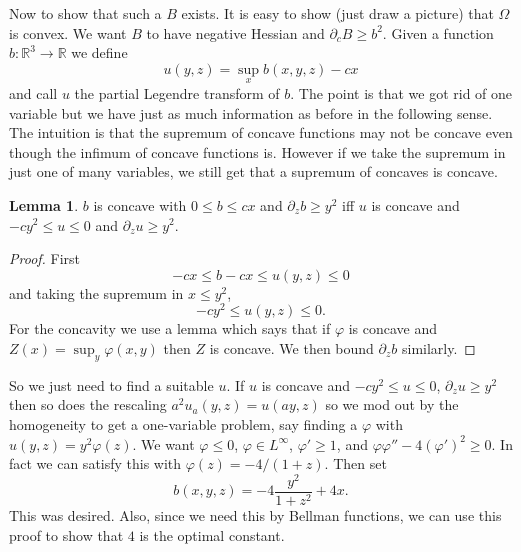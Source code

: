 \documentclass[12pt]{book}
\newcommand{\RR}{\mathbb{R}}
\theoremstyle{definition}
\newtheorem{lemma}[theorem]{Lemma}
\begin{document}
Now to show that such a $B$ exists.
It is easy to show (just draw a picture) that $\Omega$ is convex.
We want $B$ to have negative Hessian and $\partial_c B \geq b^2$.
Given a function $b: \RR^3 \to \RR$ we define
$$u(y, z) = \sup_x b(x, y, z) - cx$$
and call $u$ the partial Legendre transform of $b$.
The point is that we got rid of one variable but we have just as much information as before in the following sense.
The intuition is that the supremum of concave functions may not be concave even though the infimum of concave functions is.
However if we take the supremum in just one of many variables, we still get that a supremum of concaves is concave.

\begin{lemma}
$b$ is concave with $0 \leq b \leq cx$ and $\partial_z b \geq y^2$ iff $u$ is concave and $-cy^2 \leq u \leq 0$ and $\partial_z u \geq y^2$.
\end{lemma}
\begin{proof}
First
$$-cx \leq b - cx \leq u(y, z) \leq 0$$
and taking the supremum in $x \leq y^2$,
$$-cy^2 \leq u(y, z) \leq 0.$$
For the concavity we use a lemma which says that if $\varphi$ is concave and $Z(x) = \sup_y \varphi(x, y)$ then $Z$ is concave.
We then bound $\partial_z b$ similarly.
\end{proof}

So we just need to find a suitable $u$.
If $u$ is concave and $-cy^2 \leq u \leq 0$, $\partial_z u \geq y^2$ then so does the rescaling $a^2 u_a(y, z) = u(ay, z)$ so we mod out by the homogeneity to get a one-variable problem, say finding a $\varphi$ with $u(y, z) = y^2 \varphi(z)$.
We want $\varphi \leq 0$, $\varphi \in L^\infty$, $\varphi' \geq 1$, and $\varphi\varphi'' - 4(\varphi')^2 \geq 0$.
In fact we can satisfy this with $\varphi(z) = -4/(1 + z)$.
Then set
$$b(x, y, z) = -4\frac{y^2}{1 + z^2} + 4x.$$
This was desired.
Also, since we need this by Bellman functions, we can use this proof to show that $4$ is the optimal constant.




\newpage
\printindex
\printbibliography
\end{document}
